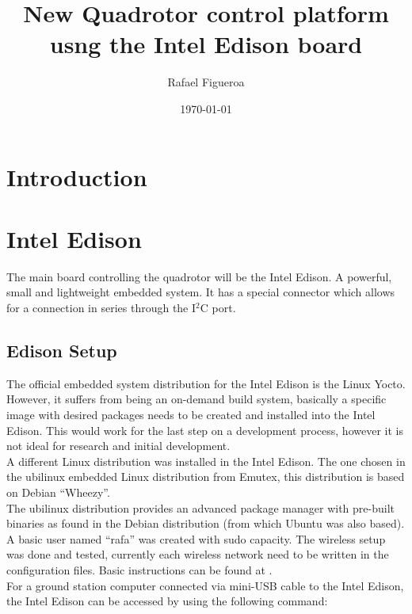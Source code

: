 \documentclass[letterpaper, 12pt]{article}
\begin{document}
\title{\Large \textbf {New Quadrotor control platform usng the Intel Edison board}}
\author{Rafael Figueroa}
\date{\today}

\maketitle

\section{Introduction}
\section{Intel Edison}
The main board controlling the quadrotor will be the Intel Edison. A powerful, small and lightweight embedded system. It has a special connector which allows for a connection in series through the I$^2$C port.

\subsection{Edison Setup}
The official embedded system distribution for the Intel Edison is the Linux Yocto. However, it suffers from being an on-demand build system, basically a specific image with desired packages needs to be created and installed into the Intel Edison. This would work for the last step on a development process, however it is not ideal for research and initial development.\\

A different Linux distribution was installed in the Intel Edison. The one chosen in the ubilinux embedded Linux distribution from Emutex\cite{ubilinux}, this distribution is based on Debian ``Wheezy''.\\

The ubilinux distribution provides an advanced package manager with pre-built binaries as found in the Debian distribution (from which Ubuntu was also based). A basic user named ``rafa'' was created with sudo capacity. The wireless setup was done and tested, currently each wireless network need to be written in the configuration files. Basic instructions can be found at \cite{edison_setup}.\\

For a ground station computer connected via mini-USB cable to the Intel Edison, the Intel Edison can be accessed by using the following command:\\
\end{document}
